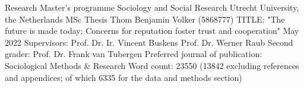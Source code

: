 
\thispagestyle{empty}
\begin{large}
\noindent Research Master's programme 
Sociology and Social Research \newline
Utrecht University, the Netherlands \newline
\newline
\newline
\newline
\newline
MSc Thesis Thom Benjamin Volker (5868777) 
\newline
TITLE: "The future is made today: Concerns for reputation foster trust and cooperation" 
\newline
May 2022 
\newline
\newline
\newline
\newline
\newline
Supervisors:\newline
Prof. Dr. Ir. Vincent Buskens \newline
Prof. Dr. Werner Raub
\newline
\newline
Second grader: \newline
Prof. Dr. Frank van Tubergen
\newline
\newline
\newline
\newline
Preferred journal of publication: Sociological Methods \& Research
\newline
Word count: 23550 (13842 excluding references and appendices; of which 6335 for the data and methods section)
\newline
\addtocounter{page}{-1}
\end{large}
\pagebreak

\let\maketitle\oldmaketitle
\maketitle